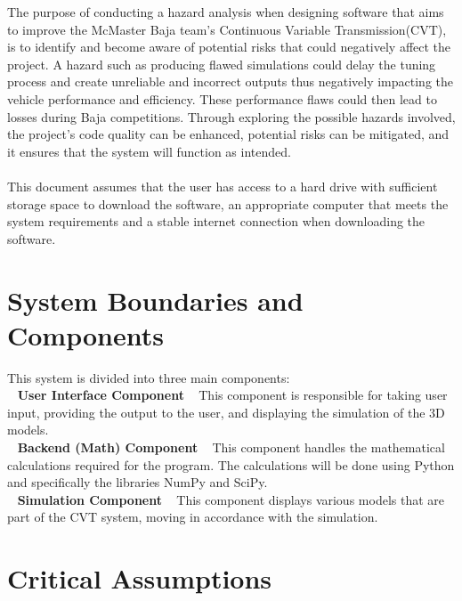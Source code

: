 \documentclass{article}
\begin{document}
The purpose of conducting a hazard analysis when designing software that aims to improve the
McMaster Baja team's Continuous Variable Transmission(CVT), is to identify and become aware of potential risks that could negatively affect the project. 
A hazard such as producing flawed simulations could delay the tuning process and create unreliable and incorrect outputs thus negatively impacting the vehicle performance and efficiency. 
These performance flaws could then lead to losses during Baja competitions. 
Through exploring the possible hazards involved, the project's code quality can be enhanced, potential risks can be mitigated, and it ensures that the system will function as intended. 
\\\\
\noindent This document assumes that the user has access to a hard drive with sufficient storage space to download the software, an appropriate computer that meets the system requirements and a stable internet connection when downloading the software. 

\section{System Boundaries and Components}

This system is divided into three main components:\\
~\newline
\textbf{User Interface Component}  
~\newline
This component is responsible for taking user input, providing the output to the user, and displaying the simulation of the 3D models.\\
~\newline
\textbf{Backend (Math) Component}  
~\newline
This component handles the mathematical calculations required for the program. The calculations will be done using Python and specifically the libraries NumPy and SciPy.\\
~\newline
\textbf{Simulation Component}  
~\newline
This component displays various models that are part of the CVT system, moving in accordance with the simulation.\\

\section{Critical Assumptions}
\end{document}
